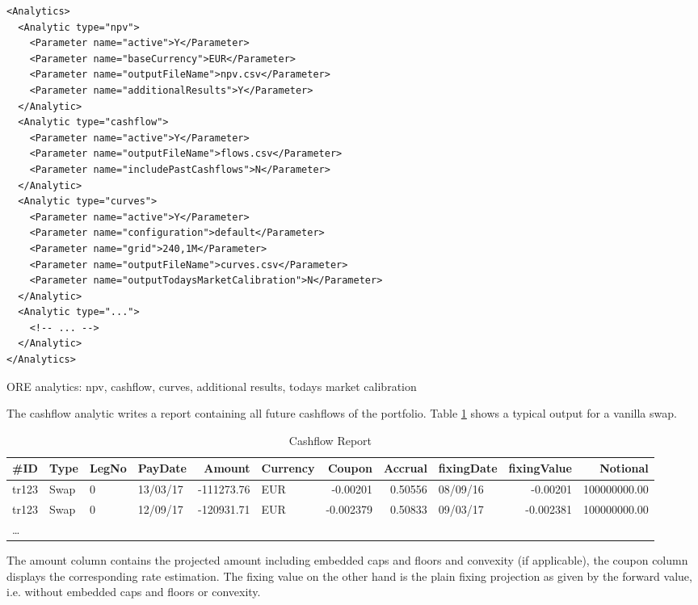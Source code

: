 \documentclass[12pt, a4paper]{article}
\begin{document}
\begin{listing}[H]
\begin{verbatim}
<Analytics>    
  <Analytic type="npv">
    <Parameter name="active">Y</Parameter>
    <Parameter name="baseCurrency">EUR</Parameter>
    <Parameter name="outputFileName">npv.csv</Parameter>
    <Parameter name="additionalResults">Y</Parameter>
  </Analytic>      
  <Analytic type="cashflow">
    <Parameter name="active">Y</Parameter>
    <Parameter name="outputFileName">flows.csv</Parameter>
    <Parameter name="includePastCashflows">N</Parameter>
  </Analytic>      
  <Analytic type="curves">
    <Parameter name="active">Y</Parameter>
    <Parameter name="configuration">default</Parameter>
    <Parameter name="grid">240,1M</Parameter>
    <Parameter name="outputFileName">curves.csv</Parameter>
    <Parameter name="outputTodaysMarketCalibration">N</Parameter>
  </Analytic>
  <Analytic type="...">
    <!-- ... -->
  </Analytic>      
</Analytics>      
\end{verbatim}
\caption{ORE analytics: npv, cashflow, curves, additional results, todays market calibration}
\label{lst:ore_analytics}
\end{listing}

The cashflow analytic writes a report containing all future cashflows of the portfolio. Table \ref{cashflowreport} shows
a typical output for a vanilla swap.

\begin{table}[hbt]
\scriptsize
\begin{center}
  \begin{tabular}{l|l|l|l|r|l|r|r|l|r|r}
\hline
\#ID & Type & LegNo & PayDate & Amount & Currency & Coupon & Accrual & fixingDate & fixingValue & Notional \\
\hline
\hline
tr123 & Swap & 0 & 13/03/17 & -111273.76 & EUR & -0.00201 & 0.50556 & 08/09/16 & -0.00201 & 100000000.00 \\
tr123 & Swap & 0 & 12/09/17 & -120931.71 & EUR & -0.002379 & 0.50833 & 09/03/17 & -0.002381 & 100000000.00 \\
\ldots
\end{tabular}
\caption{Cashflow Report}
\label{cashflowreport}
\end{center}
\end{table}

The amount column contains the projected amount including embedded caps and floors and convexity (if applicable), the
coupon column displays the corresponding rate estimation. The fixing value on the other hand is the plain fixing
projection as given by the forward value, i.e. without embedded caps and floors or convexity.
\end{document}
